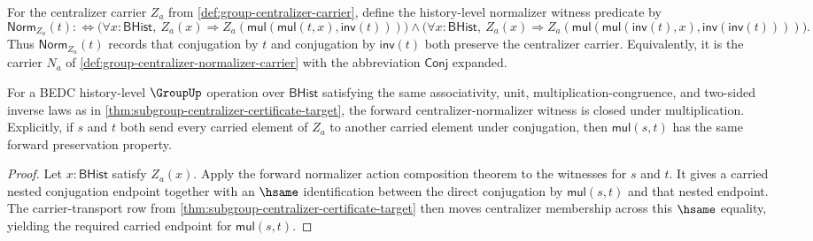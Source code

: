 \begin{definition}
\label{def:subgroup-centralizer-normalizer-witness}
For the centralizer carrier $Z_a$ from
\autoref{def:group-centralizer-carrier}, define the history-level normalizer
witness predicate by
$$
\mathsf{Norm}_{Z_a}(t) :\Longleftrightarrow
\bigl(\forall x:\mathsf{BHist},\ Z_a(x)\Rightarrow
Z_a(\mathsf{mul}(\mathsf{mul}(t,x),\mathsf{inv}(t)))\bigr)
\land
\bigl(\forall x:\mathsf{BHist},\ Z_a(x)\Rightarrow
Z_a(\mathsf{mul}(\mathsf{mul}(\mathsf{inv}(t),x),
\mathsf{inv}(\mathsf{inv}(t))))\bigr).
$$
Thus $\mathsf{Norm}_{Z_a}(t)$ records that conjugation by $t$ and conjugation by
$\mathsf{inv}(t)$ both preserve the centralizer carrier. Equivalently, it is the
carrier $N_a$ of \autoref{def:group-centralizer-normalizer-carrier} with the
abbreviation $\mathsf{Conj}$ expanded.
\end{definition}

\begin{theorem}
\label{thm:subgroup-centralizer-normalizer-mul-closed-from-empty-unit}
For a BEDC history-level $\GroupUp$ operation over $\mathsf{BHist}$ satisfying
the same associativity, unit, multiplication-congruence, and two-sided inverse
laws as in \autoref{thm:subgroup-centralizer-certificate-target}, the forward
centralizer-normalizer witness is closed under multiplication. Explicitly, if
$s$ and $t$ both send every carried element of $Z_a$ to another carried element
under conjugation, then $\mathsf{mul}(s,t)$ has the same forward preservation
property.
\end{theorem}
\begin{proof}
Let $x:\mathsf{BHist}$ satisfy $Z_a(x)$. Apply the forward normalizer action
composition theorem to the witnesses for $s$ and $t$. It gives a carried
nested conjugation endpoint together with an $\hsame$ identification between
the direct conjugation by $\mathsf{mul}(s,t)$ and that nested endpoint. The
carrier-transport row from
\autoref{thm:subgroup-centralizer-certificate-target} then moves centralizer
membership across this $\hsame$ equality, yielding the required carried
endpoint for $\mathsf{mul}(s,t)$.
\end{proof}


